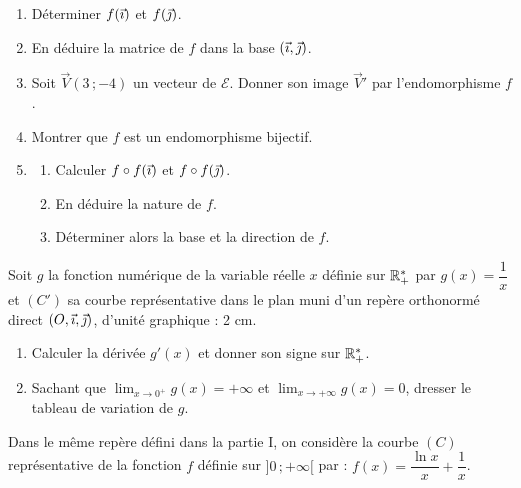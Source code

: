 \documentclass[11pt]{article}
\begin{document}
\begin{enumerate}
  \item Déterminer $f(\vec{\imath})$ et $f(\vec{\jmath})$.
  \item En déduire la matrice de $f$ dans la base $(\vec{\imath},\vec{\jmath})$.
  \item Soit $\vec{V}(3\,;-4)$ un vecteur de $\mathcal{E}$. Donner son image $\vec{V}'$ par l'endomorphisme $f$.
  \item Montrer que $f$ est un endomorphisme bijectif.
  \item \begin{enumerate}[label=\alph*.]
    \item Calculer $f \circ f(\vec{\imath})$ et $f \circ f(\vec{\jmath})$.
    \item En déduire la nature de $f$.
    \item Déterminer alors la base et la direction de $f$.
  \end{enumerate}
\end{enumerate}


Soit $g$ la fonction numérique de la variable réelle $x$ définie sur $\mathbb{R}_+^*$ par $g(x) = \dfrac{1}{x}$ et $(C')$ sa courbe représentative dans le plan muni d'un repère orthonormé direct $(O,\vec{\imath},\vec{\jmath})$, d'unité graphique : 2 cm.

\begin{enumerate}
  \item Calculer la dérivée $g'(x)$ et donner son signe sur $\mathbb{R}_+^*$.
  \item Sachant que $\displaystyle\lim_{x\to 0^+} g(x) = +\infty$ et $\displaystyle\lim_{x\to+\infty} g(x) = 0$, dresser le tableau de variation de $g$.
\end{enumerate}

Dans le même repère défini dans la partie I, on considère la courbe $(C)$ représentative de la fonction $f$ définie sur $]0\,;+\infty[$ par : $f(x) = \dfrac{\ln x}{x} + \dfrac{1}{x}$.
\end{document}
